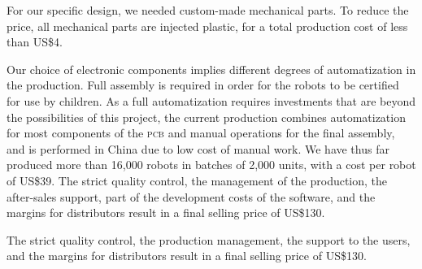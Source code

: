 \documentclass[letterpaper, 10 pt, conference]{ieeeconf}  %
\begin{document}
For our specific design, we needed custom-made mechanical parts.
To reduce the price, all mechanical parts are injected plastic, for a total production cost of less than US\$4.

Our choice of electronic components implies different degrees of automatization in the production. 
Full assembly is required in order for the robots to be certified for use by children. 
As a full automatization requires investments that are beyond the possibilities of this project, the current production combines automatization for most components of the \textsc{pcb} and manual operations for the final assembly, and is performed in China due to low cost of manual work. 
We have thus far produced more than 16,000 robots in batches of 2,000 units, with a cost per robot of US\$39.
The strict quality control, the management of the production, the after-sales support, part of the development costs of the software, and the margins
for distributors result in a final selling price of US\$130.

The strict quality control, the production management, the support to the users, and the margins for distributors result in a final selling price of US\$130.
\end{document}
